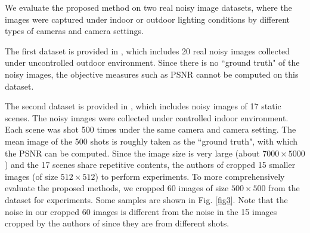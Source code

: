 \documentclass[10pt,twocolumn,letterpaper]{article}
\begin{document}
We evaluate the proposed method on two real noisy image datasets, where the images were captured under indoor or outdoor lighting conditions by different types of cameras and camera settings. 

The first dataset is provided in \cite{ncwebsite}, which includes 20 real noisy images collected under uncontrolled outdoor environment. Since there is no ``ground truth" of the noisy images, the objective measures such as PSNR cannot be computed on this dataset. 

The second dataset is provided in \cite{crosschannel2016}, which includes noisy images of 17 static scenes. The noisy images were collected under controlled indoor environment. Each scene was shot 500 times under the same camera and camera setting. The mean image of the 500 shots is roughly taken as the ``ground truth", with which the PSNR can be computed. Since the image size is very large (about $7000\times5000$) and the 17 scenes share repetitive contents, the authors of \cite{crosschannel2016} cropped 15 smaller images (of size $512\times512$) to perform experiments. To more comprehensively evaluate the proposed methods, we cropped 60 images of size $500\times500$ from the dataset for experiments. Some samples are shown in Fig. \ref{fig3}. Note that the noise in our cropped 60 images is different from the noise in the 15 images cropped by the authors of \cite{crosschannel2016} since they are from different shots.
\end{document}
